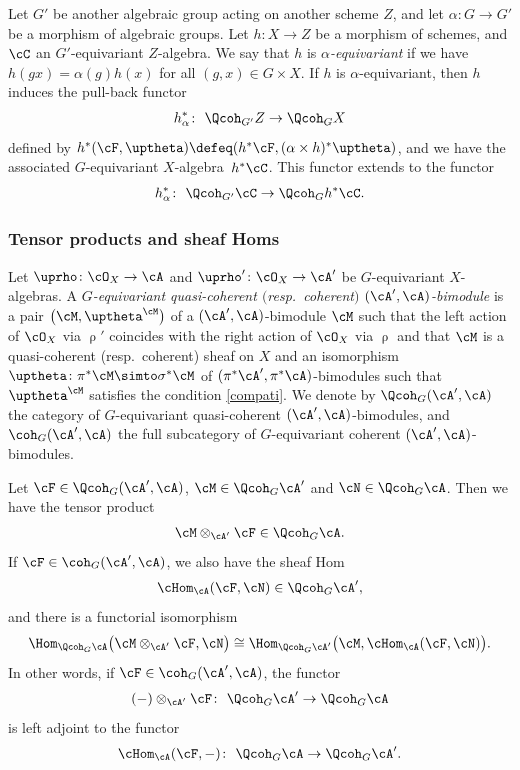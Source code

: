  Let $G'$ be another algebraic group acting on another scheme $Z$, and let $\alpha\colon G\to G'$ be a morphism of algebraic groups. Let $h\colon X\to Z$ be a morphism of schemes, and $\cC$ an $G'$-equivariant $Z$-algebra. We say that $h$ is {\it $\alpha$-equivariant} if we have $h(g x)=\alpha(g)h(x)$ for all $(g,x)\in G\times X$. If $h$ is $\alpha$-equivariant, then $h$ induces the pull-back functor
\begin{gather*}
h^*_{\alpha}\colon\ \Qcoh_{G'}Z\to \Qcoh_GX
\end{gather*}
defined by $h^*(\cF,\uptheta)\defeq(h^*\cF, (\alpha\times h)^*\uptheta)$, and we have
 the associated $G$-equivariant $X$-alge\-bra~$h^*\cC$. This functor extends to
the functor
\begin{equation*}%
h^*_{\alpha}\colon\ \Qcoh_{G'}\cC\to \Qcoh_Gh^*\cC.
\end{equation*}

\subsubsection{Tensor products and sheaf Homs}

Let $\uprho\colon\cO_{X}\to\cA$ and $\uprho'\colon\cO_{X}\to\cA'$ be $G$-equivariant $X$-algebras. A {\it $G$-equivariant quasi-coherent $($resp.\ coherent$)$ $(\cA',\cA)$-bimodule} is a pair $\big(\cM,\uptheta^{\cM}\big)$ of a $(\cA',\cA)$-bimodule $\cM$ such that the left action of $\cO_{X}$ via $\uprho'$ coincides with the right action of $\cO_{X}$ via $\uprho$ and that $\cM$ is a quasi-coherent (resp.\ coherent) sheaf on $X$ and an isomorphism $\uptheta\colon \pi^*\cM\simto\sigma^*\cM$ of $(\pi^*\cA',\pi^*\cA)$-bimodules such that $\uptheta^{\cM}$ satisfies the condition \eqref{compati}.
 We denote by
$\Qcoh_G(\cA',\cA)$ the category of $G$-equivariant quasi-coherent $(\cA',\cA)$-bimodules, and $\coh_G(\cA',\cA)$ the full subcategory of $G$-equivariant coherent $(\cA',\cA)$-bimodules.


Let $\cF\in \Qcoh_G(\cA',\cA)$, $\cM\in\Qcoh_G\cA'$ and $\cN\in \Qcoh_G\cA$. Then we have the tensor product
\begin{gather*}
\cM\otimes_{\cA'}\cF\in \Qcoh_G\cA.
\end{gather*}
If $\cF\in \coh_G(\cA',\cA)$, we also have the sheaf Hom
\begin{gather*}
\cHom_{\cA}(\cF,\cN)\in \Qcoh_G\cA',
\end{gather*}
and there is a functorial isomorphism
\begin{equation*}%
\Hom_{\Qcoh_G\cA}\big(\cM\otimes_{\cA'}\cF,\cN\big)\cong \Hom_{\Qcoh_G\cA'}\big(\cM,\cHom_{\cA}(\cF,\cN)\big).
\end{equation*}
In other words, if $\cF\in \coh_G(\cA',\cA)$, the functor
\begin{gather*}
(-)\otimes_{\cA'}\cF\colon\ \Qcoh_G\cA'\to\Qcoh_G\cA
\end{gather*}
is left adjoint to the functor
\begin{gather*}
\cHom_{\cA}(\cF,-)\colon\ \Qcoh_G\cA\to\Qcoh_G \cA'.
\end{gather*}


